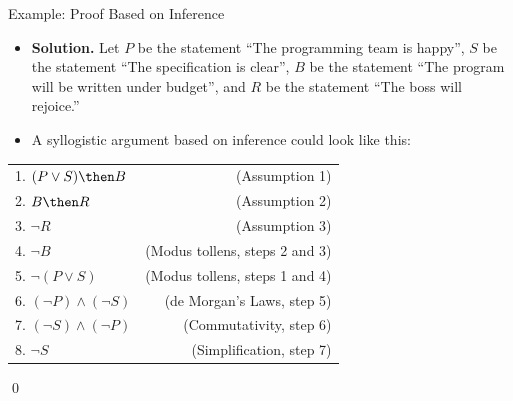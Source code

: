 \documentclass[12pt,aspectratio=1610, handout]{beamer}
\begin{document}
\begin{frame}{Example: Proof Based on Inference}
	\begin{itemize}
		\item \textbf{Solution.} Let $P$ be the statement ``The programming team is happy'', $S$ be the statement ``The specification is clear'', $B$ be the statement ``The program will be written under budget'', and $R$ be the statement ``The boss will rejoice.'' 
		\item A syllogistic argument based on inference could look like this: 
	\end{itemize}
	\begin{center}
		\begin{tabular}{lr}
			1. $(P \vee S) \then B$ & (Assumption 1) \\
			2. $B \then R$ & (Assumption 2) \\
			3. $\neg R$ & (Assumption 3) \\
			4. $\neg B$ & (Modus tollens, steps 2 and 3) \\
			5. $\neg(P \vee S)$ & (Modus tollens, steps 1 and 4) \\
			6. $(\neg P) \wedge (\neg S)$ & (de Morgan's Laws, step 5) \\
			7. $(\neg S) \wedge (\neg P)$ & (Commutativity, step 6) \\
			8. $\neg S$ & (Simplification, step 7)
		\end{tabular}
	\end{center}
	\qed
\end{frame}
\end{document}
